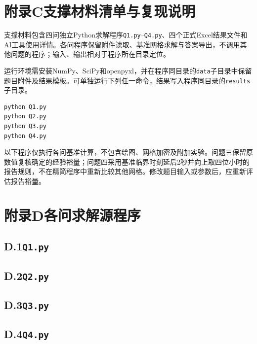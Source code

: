 \section*{附录C\quad 支撑材料清单与复现说明}
支撑材料包含四问独立Python求解程序\texttt{Q1.py}--\texttt{Q4.py}、四个正式Excel结果文件和AI工具使用详情。各问程序保留附件读取、基准网格求解与答案导出，不调用其他问题的程序；输入、输出相对于程序所在目录定位。

运行环境需安装NumPy、SciPy和openpyxl，并在程序同目录的\texttt{data}子目录中保留题目附件及结果模板。可单独运行下列任一命令，结果写入程序同目录的\texttt{results}子目录。
\begin{Verbatim}[fontsize=\small,breaklines=true]
python Q1.py
python Q2.py
python Q3.py
python Q4.py
\end{Verbatim}

以下程序仅执行各问基准计算，不包含绘图、网格加密及附加实验。问题三保留原数值复核确定的经验裕量；问题四采用基准临界时刻延后2秒并向上取四位小时的报告规则，不在精简程序中重新比较其他网格。修改题目输入或参数后，应重新评估报告裕量。

\section*{附录D\quad 各问求解源程序}

\subsection*{D.1\quad\texttt{Q1.py}}

\subsection*{D.2\quad\texttt{Q2.py}}

\subsection*{D.3\quad\texttt{Q3.py}}

\subsection*{D.4\quad\texttt{Q4.py}}
